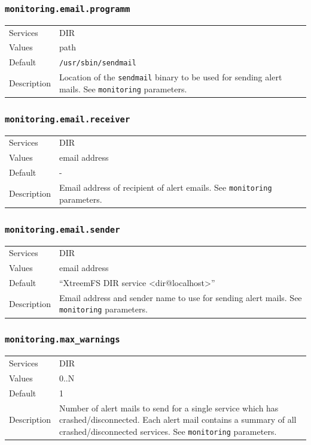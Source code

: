\documentclass[a4paper,10pt]{book}
\begin{document}
\subsubsection{\texttt{monitoring.email.programm}}
\begin{tabular}{lp{10cm}}
 Services & DIR\\
 Values   & path \\
 Default  & \texttt{/usr/sbin/sendmail} \\
 Description & Location of the \texttt{sendmail} binary to be used for sending alert mails. See \texttt{monitoring} parameters.
\end{tabular}

\subsubsection{\texttt{monitoring.email.receiver}}
\begin{tabular}{lp{10cm}}
 Services & DIR\\
 Values   & email address \\
 Default  & - \\
 Description & Email address of recipient of alert emails. See \texttt{monitoring} parameters.
\end{tabular}

\subsubsection{\texttt{monitoring.email.sender}}
\begin{tabular}{lp{10cm}}
 Services & DIR\\
 Values   & email address \\
 Default  & ``XtreemFS DIR service <dir@localhost>''\\
 Description & Email address and sender name to use for sending alert mails. See \texttt{monitoring} parameters.
\end{tabular}

\subsubsection{\texttt{monitoring.max\_warnings}}
\begin{tabular}{lp{10cm}}
 Services & DIR\\
 Values   & 0..N \\
 Default  & 1\\
 Description & Number of alert mails to send for a single service which has crashed/disconnected. Each alert mail contains a summary of all crashed/disconnected services. See \texttt{monitoring} parameters.
\end{tabular}
\end{document}
